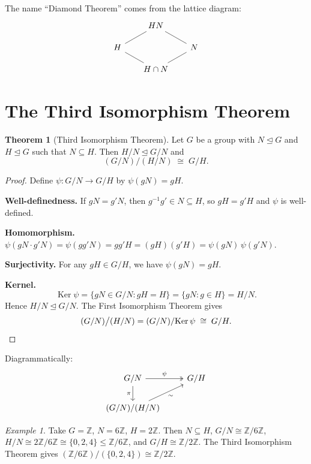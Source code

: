 \documentclass[12pt,a4paper,openany]{book}
\theoremstyle{definition}
\newtheorem{theorem}{Theorem}[chapter]
\theoremstyle{remark}
\newtheorem{example}{Example}[chapter]
\newcommand{\Z}{\mathbb{Z}}
\DeclareMathOperator{\Ker}{Ker}
\begin{document}
The name ``Diamond Theorem'' comes from the lattice diagram:
\[
\begin{tikzcd}[row sep=1.2em, column sep=1.8em]
& HN \arrow[dl,dash] \arrow[dr,dash] & \\
H \arrow[dr,dash] & & N \arrow[dl,dash] \\
& H\cap N &
\end{tikzcd}
\]

\section{The Third Isomorphism Theorem}\label{sec:third-iso}

\begin{theorem}[Third Isomorphism Theorem]\label{thm:third-iso}
Let $G$ be a group with $N\trianglelefteq G$ and $H\trianglelefteq G$
such that $N\subseteq H$.  Then $H/N\trianglelefteq G/N$ and
\[
   (G/N)\big/(H/N) \;\cong\; G/H.
\]
\end{theorem}

\begin{proof}
Define $\psi\colon G/N\to G/H$ by $\psi(gN)=gH$.

\textbf{Well-definedness.}
If $gN=g'N$, then $g^{-1}g'\in N\subseteq H$, so $gH=g'H$ and
$\psi$ is well-defined.

\textbf{Homomorphism.}
$\psi(gN\cdot g'N)=\psi(gg'N)=gg'H=(gH)(g'H)=\psi(gN)\,\psi(g'N)$.

\textbf{Surjectivity.}
For any $gH\in G/H$, we have $\psi(gN)=gH$.

\textbf{Kernel.}
\[
   \Ker\psi = \{gN\in G/N : gH=H\} = \{gN : g\in H\} = H/N.
\]
Hence $H/N\trianglelefteq G/N$.  The First Isomorphism Theorem gives
\[
   (G/N)\big/(H/N) = (G/N)/\!\Ker\psi \;\cong\; G/H. \qedhere
\]
\end{proof}

Diagrammatically:
\[
\begin{tikzcd}
G/N \arrow[r,"\psi",two heads] \arrow[d,"\pi"'] & G/H \\
(G/N)/(H/N) \arrow[ru,"\sim"'] &
\end{tikzcd}
\]

\begin{example}\label{ex:third-iso-Z}
Take $G=\Z$, $N=6\Z$, $H=2\Z$.  Then $N\subseteq H$,
$G/N\cong\Z/6\Z$, $H/N\cong 2\Z/6\Z\cong\{0,2,4\}\le\Z/6\Z$,
and $G/H\cong\Z/2\Z$.
The Third Isomorphism Theorem gives
$(\Z/6\Z)/(\{0,2,4\})\cong\Z/2\Z$.
\end{example}
\end{document}
